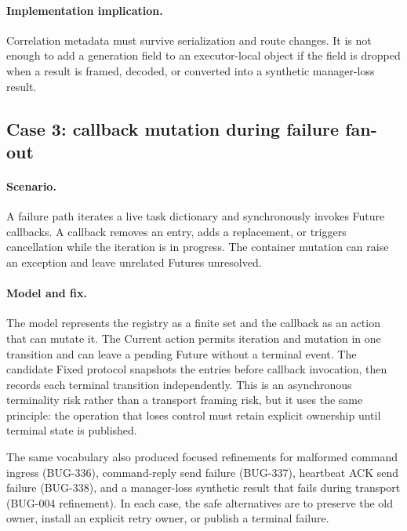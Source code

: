 \documentclass[11pt,a4paper]{article}
\begin{document}
\paragraph{Implementation implication.} Correlation metadata must survive serialization and route
changes. It is not enough to add a generation field to an executor-local object if the field is
dropped when a result is framed, decoded, or converted into a synthetic manager-loss result.

\subsection{Case 3: callback mutation during failure fan-out}
\paragraph{Scenario.} A failure path iterates a live task dictionary and synchronously invokes
Future callbacks. A callback removes an entry, adds a replacement, or triggers cancellation while
the iteration is in progress. The container mutation can raise an exception and leave unrelated
Futures unresolved.

\paragraph{Model and fix.} The model represents the registry as a finite set and the callback as an
action that can mutate it. The Current action permits iteration and mutation in one transition and
can leave a pending Future without a terminal event. The candidate Fixed protocol snapshots the
entries before callback invocation, then records each terminal transition independently. This is an
asynchronous terminality risk rather than a transport framing risk, but it uses the same principle:
the operation that loses control must retain explicit ownership until terminal state is published.

The same vocabulary also produced focused refinements for malformed command ingress (BUG-336),
command-reply send failure (BUG-337), heartbeat ACK send failure (BUG-338), and a manager-loss
synthetic result that fails during transport (BUG-004 refinement). In each case, the safe alternatives
are to preserve the old owner, install an explicit retry owner, or publish a terminal failure.
\end{document}
